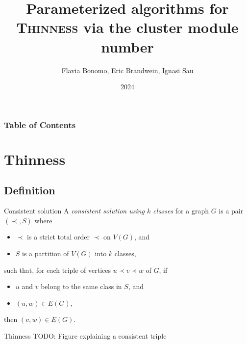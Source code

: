 \documentclass{beamer}
\title[Param. algorithms for \text{Thinness} via the cluster module number]{Parameterized algorithms for \textsc{Thinness} via the cluster module number}
\author{Flavia Bonomo, Eric Brandwein, Ignasi Sau}
\institute{Group: Graph Theory and Combinatorial Optimization}
\date{2024}
\begin{document}

\frame{\titlepage}


\begin{frame}
    \frametitle{Table of Contents}
    \tableofcontents[hideallsubsections]
\end{frame}

\section{Thinness}
\subsection{Definition}
\begin{frame}{Consistent solution}
    A \emph{consistent solution using $k$ classes} for a graph $G$ is a pair $(\prec, S)$ where 
    \begin{itemize}
        \item $\prec$ is a strict total order $\prec$ on $V(G)$, and 
        \item $S$ is a partition of $V(G)$ into $k$ classes,
    \end{itemize}
    such that, for each triple of vertices $u\prec v \prec w$ of $G$, if
    \begin{itemize}
        \item $u$ and $v$ belong to the same class in $S$, and
        \item $(u,w) \in E(G)$,
    \end{itemize}
    then $(v,w) \in E(G)$.
\end{frame}

\begin{frame}{Thinness}
    TODO: Figure explaining a consistent triple
\end{frame}
\end{document}

